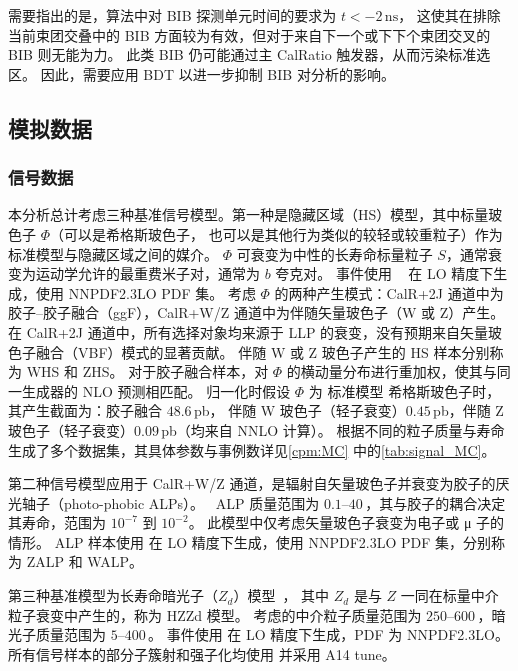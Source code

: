 需要指出的是，算法中对 BIB 探测单元时间的要求为 $t < -2\,\mathrm{ns}$，
这使其在排除当前束团交叠中的 BIB 方面较为有效，但对于来自下一个或下下个束团交叉的 BIB 则无能为力。
此类 BIB 仍可能通过主 CalRatio 触发器，从而污染标准选区。
因此，需要应用 BDT 以进一步抑制 BIB 对分析的影响。


\subsection{模拟数据}
\label{sec:MC}

\subsubsection{信号数据}
本分析总计考虑三种基准信号模型。第一种是隐藏区域（HS）模型，其中标量玻色子 $\Phi$（可以是希格斯玻色子，
也可以是其他行为类似的较轻或较重粒子）作为标准模型与隐藏区域之间的媒介。
$\Phi$ 可衰变为中性的长寿命标量粒子 $S$，通常衰变为运动学允许的最重费米子对，通常为 $b$ 夸克对。
事件使用 ~\cite{Alwall:2014hca} 在 LO 精度下生成，使用 NNPDF2.3LO PDF 集。
考虑 $\Phi$ 的两种产生模式：CalR+2J 通道中为胶子--胶子融合（ggF），CalR+W/Z 通道中为伴随矢量玻色子（W 或 Z）产生。
在 CalR+2J 通道中，所有选择对象均来源于 LLP 的衰变，没有预期来自矢量玻色子融合（VBF）模式的显著贡献。
伴随 W 或 Z 玻色子产生的 HS 样本分别称为 WHS 和 ZHS。
对于胶子融合样本，对 $\Phi$ 的横动量分布进行重加权，使其与同一生成器的 NLO 预测相匹配。
归一化时假设 $\Phi$ 为 标准模型 希格斯玻色子时，其产生截面为：胶子融合 $48.6$\,pb，
伴随 W 玻色子（轻子衰变）$0.45$\,pb，伴随 Z 玻色子（轻子衰变）$0.09$\,pb（均来自 NNLO 计算）。
根据不同的粒子质量与寿命生成了多个数据集，其具体参数与事例数详见\autoref{cpm:MC} 中的\autoref{tab:signal_MC}。

第二种信号模型应用于 CalR+W/Z 通道，是辐射自矢量玻色子并衰变为胶子的厌光轴子（photo-phobic ALPs）。~\cite{Brivio:2017ije}
ALP 质量范围为 $0.1$--$40$\,\GeV，其与胶子的耦合决定其寿命，范围为 $10^{-7}$ 到 $10^{-2}$。
此模型中仅考虑矢量玻色子衰变为电子或 μ 子的情形。
ALP 样本使用  在 LO 精度下生成，使用 NNPDF2.3LO PDF 集，分别称为 ZALP 和 WALP。

第三种基准模型为长寿命暗光子（$Z_d$）模型~\cite{Davoudiasl:2012ag, Davoudiasl:2013aya}，
其中 $Z_d$ 是与 $Z$ 一同在标量中介粒子衰变中产生的，称为 HZZd 模型。
考虑的中介粒子质量范围为 $250$--$600$\,\GeV，暗光子质量范围为 $5$--$400$\,\GeV。
事件使用   在 LO 精度下生成，PDF 为 NNPDF2.3LO。
所有信号样本的部分子簇射和强子化均使用  并采用 A14 tune。

